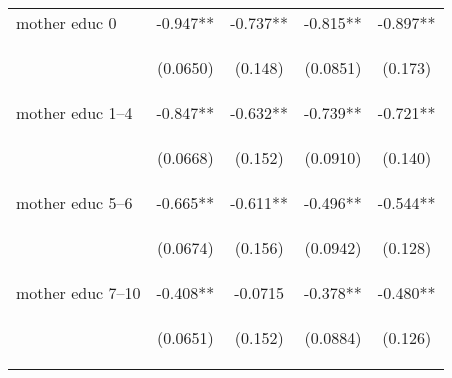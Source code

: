 \documentclass{article}[11pt,subeqn]
\begin{document}
\begin{spacing}{1.5}
\begin{table}[ht]
\begin{center}
\begin{tabular}{lcccc}
mother educ 0 & -0.947** & -0.737** & -0.815** & -0.897** \\
\vspace{4pt} & \begin{footnotesize}(0.0650)\end{footnotesize} & \begin{footnotesize}(0.148)\end{footnotesize} & \begin{footnotesize}(0.0851)\end{footnotesize} & \begin{footnotesize}(0.173)\end{footnotesize} \\
mother educ 1--4 & -0.847** & -0.632** & -0.739** & -0.721** \\
\vspace{4pt} & \begin{footnotesize}(0.0668)\end{footnotesize} & \begin{footnotesize}(0.152)\end{footnotesize} & \begin{footnotesize}(0.0910)\end{footnotesize} & \begin{footnotesize}(0.140)\end{footnotesize} \\
mother educ 5--6 & -0.665** & -0.611** & -0.496** & -0.544** \\
\vspace{4pt} & \begin{footnotesize}(0.0674)\end{footnotesize} & \begin{footnotesize}(0.156)\end{footnotesize} & \begin{footnotesize}(0.0942)\end{footnotesize} & \begin{footnotesize}(0.128)\end{footnotesize} \\
mother educ 7--10 & -0.408** & -0.0715 & -0.378** & -0.480** \\
\vspace{4pt} & \begin{footnotesize}(0.0651)\end{footnotesize} & \begin{footnotesize}(0.152)\end{footnotesize} & \begin{footnotesize}(0.0884)\end{footnotesize} & \begin{footnotesize}(0.126)\end{footnotesize} \\

\end{tabular}
\end{center}
\end{table}
\end{spacing}
\end{document}
